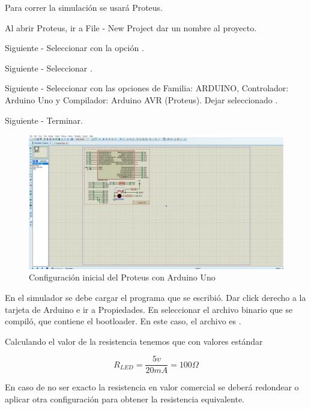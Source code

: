 \documentclass{article}
\begin{document}
Para correr la simulación se usará Proteus.

\bigbreak

Al abrir Proteus, ir a File - New Project dar un nombre al proyecto.

\bigbreak

Siguiente - Seleccionar  con la opción .

\bigbreak

Siguiente - Seleccionar .

\bigbreak

Siguiente - Seleccionar  con las opciones de Familia: ARDUINO, Controlador: 
Arduino Uno y Compilador: Arduino AVR (Proteus). Dejar seleccionado .

\bigbreak

Siguiente - Terminar.

\begin{figure}[H]
    \centering
    \includegraphics[width=0.5\paperwidth]{images/sim-1.png}
    \caption{Configuración inicial del Proteus con Arduino Uno}
\end{figure}

En el simulador se debe cargar el programa que se escribió. Dar click derecho a la tarjeta de Arduino e ir a
Propiedades. En  seleccionar el archivo binario que se compiló, que contiene el bootloader.
En este caso, el archivo es .

\bigbreak

Calculando el valor de la resistencia tenemos que con valores estándar

$$
R_{LED} = \frac{5v}{20mA} = 100\Omega
$$

En caso de no ser exacto la resistencia en valor comercial se deberá redondear o aplicar otra configuración para obtener la resistencia equivalente.
\end{document}
